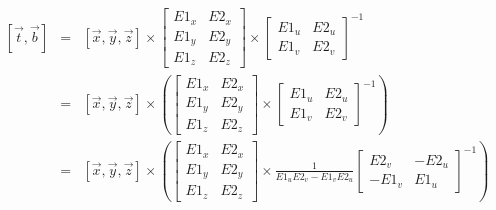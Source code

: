 \documentclass[12pt]{article}
\begin{document}
        \begin{eqnarray*}
            \left[ \overrightarrow{t}, \overrightarrow{b} \right]       
            & = &
            \left[ \overrightarrow{x}, \overrightarrow{y}, \overrightarrow{z} \right]       
            \times
            \left[ \begin{array}{cc}
                E1_x & E2_x \\
                E1_y & E2_y \\
                E1_z & E2_z
            \end{array} \right]
            \times
            \left[ \begin{array}{cc}
                E1_u & E2_u \\
                E1_v & E2_v
            \end{array} \right]^{-1} \\
            & = &
            \left[ \overrightarrow{x}, \overrightarrow{y}, \overrightarrow{z} \right]       
            \times
            \left(
                \left[ \begin{array}{cc}
                    E1_x & E2_x \\
                    E1_y & E2_y \\
                    E1_z & E2_z
                \end{array} \right]
                \times
                \left[ \begin{array}{cc}
                    E1_u & E2_u \\
                    E1_v & E2_v
                \end{array} \right]^{-1}
            \right) \\
            & = &
            \left[ \overrightarrow{x}, \overrightarrow{y}, \overrightarrow{z} \right]       
            \times
            \left(
                \left[ \begin{array}{cc}
                    E1_x & E2_x \\
                    E1_y & E2_y \\
                    E1_z & E2_z
                \end{array} \right]
                \times
                \frac{1}{E1_uE2_v-E1_vE2_u}
                \left[ \begin{array}{cc}
                     E2_v & -E2_u \\
                    -E1_v &  E1_u
                \end{array} \right]^{-1}
            \right) \\

\end{eqnarray*}
\end{document}
